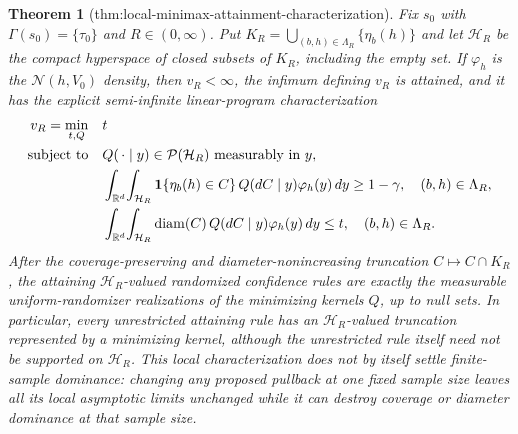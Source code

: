 \documentclass{article}
\newtheorem{theorem}{Theorem}
\begin{document}
\begin{theorem}[thm:local-minimax-attainment-characterization]\label{thm:local-minimax-attainment-characterization}
Fix \(s_0\) with \(\Gamma(s_0)=\{\tau_0\}\) and \(R\in(0,\infty)\).  Put \(K_R=\bigcup_{(b,h)\in\Lambda_R}\{\eta_b(h)\}\) and let \(\mathcal H_R\) be the compact hyperspace of closed subsets of \(K_R\), including the empty set.  If \(\varphi_h\) is the \(\mathcal N(h,V_0)\) density, then \(v_R<\infty\), the infimum defining \(v_R\) is attained, and it has the explicit semi-infinite linear-program characterization
\[
\begin{aligned}
v_R=\min_{t,Q}\quad &t\\
\text{subject to}\quad
&Q(\,\cdot\mid y)\in\mathcal P(\mathcal H_R)\text{ measurably in }y,\\
&\int_{\mathbb R^d}\!\int_{\mathcal H_R}
  {\bf1}\{\eta_b(h)\in C\}\,Q(dC\mid y)\varphi_h(y)\,dy
  \ge1-\gamma,\quad (b,h)\in\Lambda_R,\\
&\int_{\mathbb R^d}\!\int_{\mathcal H_R}
  \operatorname{diam}(C)\,Q(dC\mid y)\varphi_h(y)\,dy
  \le t,\quad (b,h)\in\Lambda_R.
\end{aligned}
\]
After the coverage-preserving and diameter-nonincreasing truncation \(C\mapsto C\cap K_R\), the attaining \(\mathcal H_R\)-valued randomized confidence rules are exactly the measurable uniform-randomizer realizations of the minimizing kernels \(Q\), up to null sets.  In particular, every unrestricted attaining rule has an \(\mathcal H_R\)-valued truncation represented by a minimizing kernel, although the unrestricted rule itself need not be supported on \(\mathcal H_R\).  This local characterization does not by itself settle finite-sample dominance: changing any proposed pullback at one fixed sample size leaves all its local asymptotic limits unchanged while it can destroy coverage or diameter dominance at that sample size.
\end{theorem}
\end{document}
